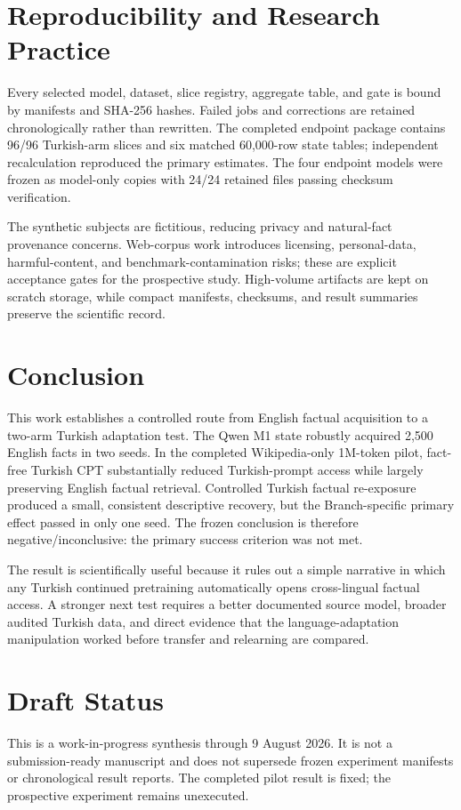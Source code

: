 \documentclass[10pt,a4paper,twocolumn]{article}
\newcommand{\mone}{M1}
\begin{document}
\section{Reproducibility and Research Practice}

Every selected model, dataset, slice registry, aggregate table, and gate is bound by manifests and SHA-256 hashes. Failed jobs and corrections are retained chronologically rather than rewritten. The completed endpoint package contains 96/96 Turkish-arm slices and six matched 60,000-row state tables; independent recalculation reproduced the primary estimates. The four endpoint models were frozen as model-only copies with 24/24 retained files passing checksum verification.

The synthetic subjects are fictitious, reducing privacy and natural-fact provenance concerns. Web-corpus work introduces licensing, personal-data, harmful-content, and benchmark-contamination risks; these are explicit acceptance gates for the prospective study. High-volume artifacts are kept on scratch storage, while compact manifests, checksums, and result summaries preserve the scientific record.

\section{Conclusion}

This work establishes a controlled route from English factual acquisition to a two-arm Turkish adaptation test. The Qwen \mone{} state robustly acquired 2,500 English facts in two seeds. In the completed Wikipedia-only 1M-token pilot, fact-free Turkish CPT substantially reduced Turkish-prompt access while largely preserving English factual retrieval. Controlled Turkish factual re-exposure produced a small, consistent descriptive recovery, but the Branch-specific primary effect passed in only one seed. The frozen conclusion is therefore negative/inconclusive: the primary success criterion was not met.

The result is scientifically useful because it rules out a simple narrative in which any Turkish continued pretraining automatically opens cross-lingual factual access. A stronger next test requires a better documented source model, broader audited Turkish data, and direct evidence that the language-adaptation manipulation worked before transfer and relearning are compared.

\section*{Draft Status}

This is a work-in-progress synthesis through 9 August 2026. It is not a submission-ready manuscript and does not supersede frozen experiment manifests or chronological result reports. The completed pilot result is fixed; the prospective experiment remains unexecuted.



\end{document}

